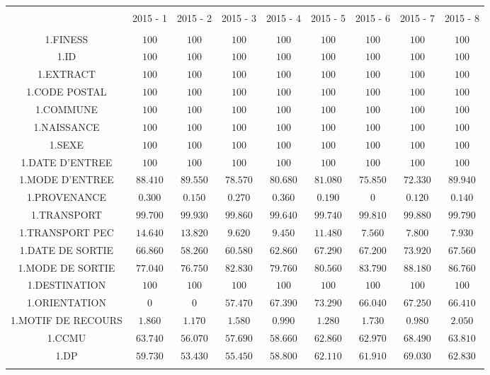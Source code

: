\documentclass[]{article}
\begin{document}
\begin{table}[!htbp] \centering 
  \caption{} 
  \label{} 
\begin{tabular}{@{\extracolsep{5pt}} ccccccccc} 
\\[-1.8ex]\hline 
\hline \\[-1.8ex] 
 & 2015 - 1 & 2015 - 2 & 2015 - 3 & 2015 - 4 & 2015 - 5 & 2015 - 6 & 2015 - 7 & 2015 - 8 \\ 
\hline \\[-1.8ex] 
1.FINESS & $100$ & $100$ & $100$ & $100$ & $100$ & $100$ & $100$ & $100$ \\ 
1.ID & $100$ & $100$ & $100$ & $100$ & $100$ & $100$ & $100$ & $100$ \\ 
1.EXTRACT & $100$ & $100$ & $100$ & $100$ & $100$ & $100$ & $100$ & $100$ \\ 
1.CODE POSTAL & $100$ & $100$ & $100$ & $100$ & $100$ & $100$ & $100$ & $100$ \\ 
1.COMMUNE & $100$ & $100$ & $100$ & $100$ & $100$ & $100$ & $100$ & $100$ \\ 
1.NAISSANCE & $100$ & $100$ & $100$ & $100$ & $100$ & $100$ & $100$ & $100$ \\ 
1.SEXE & $100$ & $100$ & $100$ & $100$ & $100$ & $100$ & $100$ & $100$ \\ 
1.DATE D'ENTREE & $100$ & $100$ & $100$ & $100$ & $100$ & $100$ & $100$ & $100$ \\ 
1.MODE D'ENTREE & $88.410$ & $89.550$ & $78.570$ & $80.680$ & $81.080$ & $75.850$ & $72.330$ & $89.940$ \\ 
1.PROVENANCE & $0.300$ & $0.150$ & $0.270$ & $0.360$ & $0.190$ & $0$ & $0.120$ & $0.140$ \\ 
1.TRANSPORT & $99.700$ & $99.930$ & $99.860$ & $99.640$ & $99.740$ & $99.810$ & $99.880$ & $99.790$ \\ 
1.TRANSPORT PEC & $14.640$ & $13.820$ & $9.620$ & $9.450$ & $11.480$ & $7.560$ & $7.800$ & $7.930$ \\ 
1.DATE DE SORTIE & $66.860$ & $58.260$ & $60.580$ & $62.860$ & $67.290$ & $67.200$ & $73.920$ & $67.560$ \\ 
1.MODE DE SORTIE & $77.040$ & $76.750$ & $82.830$ & $79.760$ & $80.560$ & $83.790$ & $88.180$ & $86.760$ \\ 
1.DESTINATION & $100$ & $100$ & $100$ & $100$ & $100$ & $100$ & $100$ & $100$ \\ 
1.ORIENTATION & $0$ & $0$ & $57.470$ & $67.390$ & $73.290$ & $66.040$ & $67.250$ & $66.410$ \\ 
1.MOTIF DE RECOURS & $1.860$ & $1.170$ & $1.580$ & $0.990$ & $1.280$ & $1.730$ & $0.980$ & $2.050$ \\ 
1.CCMU & $63.740$ & $56.070$ & $57.690$ & $58.660$ & $62.860$ & $62.970$ & $68.490$ & $63.810$ \\ 
1.DP & $59.730$ & $53.430$ & $55.450$ & $58.800$ & $62.110$ & $61.910$ & $69.030$ & $62.830$ \\ 
\hline \\[-1.8ex] 
\end{tabular} 
\end{table}
\end{document}
